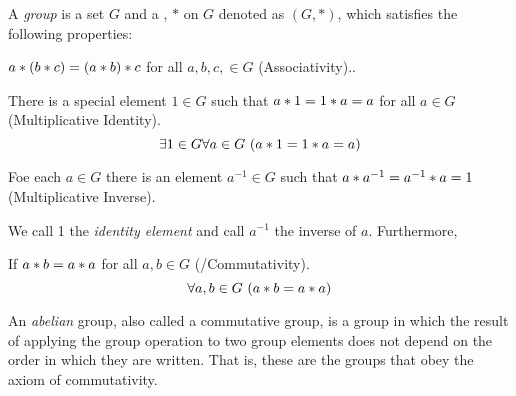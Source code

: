 \begin{definition}[Group]\label{def:Group}
  A \emph{group} is a set $G$ and a , $*$ on $G$ denoted as $(G, *)$, which satisfies the following properties:
  \begin{propertylist}
  \item $a * (b * c) = (a * b) * c$ for all $a, b, c, \in G$ (Associativity).\label{prop:Group_Properties-Associativity}.
  \item There is a special element $1 \in G$ such that $a * 1 = 1 * a = a$ for all $a \in G$ (Multiplicative Identity).\label{prop:Group_Properties-Multiplicative_Identity}
    \begin{equation*}
      \exists 1 \in G \forall a \in G \, \left( a * 1 = 1 * a = a \right)
    \end{equation*}

  \item Foe each $a \in G$ there is an element $a^{-1} \in G$ such that $a * a^{-1} = a^{-1} * a = 1$  (Multiplicative Inverse).\label{prop:Group_Properties-Mutliplicative_Inverse}
  \end{propertylist}
  
  We call 1 the \emph{identity element} and call $a^{-1}$ the inverse of $a$.
  Furthermore,
  \begin{propertylist}[resume]
  \item If $a * b = a * a$ for all $a,b \in G$ (/Commutativity).\label{prop:Group_Properties-Commutativity}
    \begin{equation*}
      \forall a,b \in G \, \left( a * b = a * a \right)
    \end{equation*}
  \end{propertylist}
\end{definition}

\begin{definition}[Abelian]\label{def:Abelian}
  An \emph{abelian} group, also called a commutative group, is a group in which the result of applying the group operation to two group elements does not depend on the order in which they are written.
  That is, these are the groups that obey the axiom of commutativity.
\end{definition}

